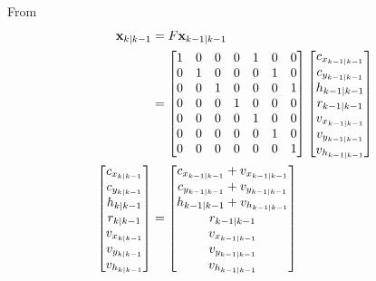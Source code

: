 \documentclass[10pt]{article}
\begin{document}
    From 
    \begin{align}
        \mathbf{x}_{k|k-1} &= F\mathbf{x}_{k-1|k-1} \notag\\
                           &= \begin{bmatrix}
                               1 & 0 & 0 & 0 & 1 & 0 & 0 \\
                               0 & 1 & 0 & 0 & 0 & 1 & 0 \\
                               0 & 0 & 1 & 0 & 0 & 0 & 1 \\
                               0 & 0 & 0 & 1 & 0 & 0 & 0 \\
                               0 & 0 & 0 & 0 & 1 & 0 & 0 \\
                               0 & 0 & 0 & 0 & 0 & 1 & 0 \\
                               0 & 0 & 0 & 0 & 0 & 0 & 1 
                            \end{bmatrix}
                            \begin{bmatrix}
                                c_{x_{k-1|k-1}}  \\
                                c_{y_{k-1|k-1}}  \\
                                h_{k-1|k-1}  \\
                                r_{k-1|k-1}  \\
                                v_{x_{k-1|k-1}} \\
                                v_{y_{k-1|k-1}} \\
                                v_{h_{k-1|k-1}}
                            \end{bmatrix} \notag\\
        \begin{bmatrix}
            c_{x_{k|k-1}} \\
            c_{y_{k|k-1}} \\
            h_{k|k-1}  \\
            r_{k|k-1} \\
            v_{x_{k|k-1}} \\
            v_{y_{k|k-1}} \\
            v_{h_{k|k-1}}
        \end{bmatrix}  &= \begin{bmatrix}
            c_{x_{k-1|k-1}} + v_{x_{k-1|k-1}} \\
            c_{y_{k-1|k-1}} + v_{y_{k-1|k-1}} \\
            h_{k-1|k-1} + v_{h_{k-1|k-1}} \\
            r_{k-1|k-1} \\
            v_{x_{k-1|k-1}} \\
            v_{y_{k-1|k-1}} \\
            v_{h_{k-1|k-1}}
        \end{bmatrix}
        \label{Eq:State_Predict}
    \end{align}
\end{document}
